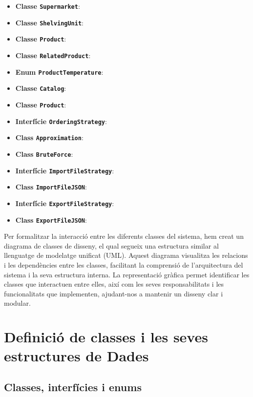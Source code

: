 \documentclass[a4paper,12pt]{report}
\begin{document}
	\begin{itemize}
		\item \textbf{Classe \texttt{Supermarket}}:
		\item \textbf{Classe \texttt{ShelvingUnit}}:
		\item \textbf{Classe \texttt{Product}}:
		\item \textbf{Classe \texttt{RelatedProduct}}:
		\item \textbf{Enum \texttt{ProductTemperature}}:
		\item \textbf{Classe \texttt{Catalog}}:
		\item \textbf{Classe \texttt{Product}}:
		\item \textbf{Interfície \texttt{OrderingStrategy}}:
		\item \textbf{Class \texttt{Approximation}}:
		\item \textbf{Class \texttt{BruteForce}}:
		\item \textbf{Interfície \texttt{ImportFileStrategy}}:
		\item \textbf{Class \texttt{ImportFileJSON}}:
		\item \textbf{Interfície \texttt{ExportFileStrategy}}:
		\item \textbf{Class \texttt{ExportFileJSON}}:
	\end{itemize}

	Per formalitzar la interacció entre les diferents classes del sistema, hem creat un diagrama de classes de disseny, el qual segueix una estructura similar al llenguatge de modelatge unificat (UML). Aquest diagrama visualitza les relacions i les dependències entre les classes, facilitant la comprensió de l'arquitectura del sistema i la seva estructura interna. La representació gràfica permet identificar les classes que interactuen entre elles, així com les seves responsabilitats i les funcionalitats que implementen, ajudant-nos a mantenir un disseny clar i modular.


	\chapter{Definició de classes i les seves estructures de Dades}
	
	\section{Classes, interfícies i enums}
\end{document}
